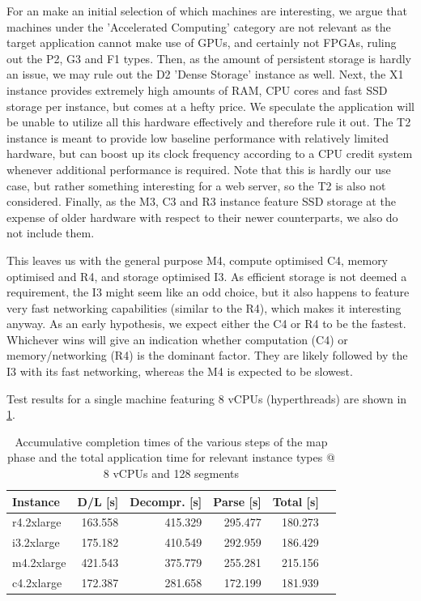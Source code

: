 \documentclass{article}
\begin{document}
For an make an initial selection of which machines are interesting, we argue that machines under the 'Accelerated Computing' category are not relevant as the target application cannot make use of GPUs, and certainly not FPGAs, ruling out the P2, G3 and F1 types. Then, as the amount of persistent storage is hardly an issue, we may rule out the D2 'Dense Storage' instance as well. Next, the X1 instance provides extremely high amounts of RAM, CPU cores and fast SSD storage per instance, but comes at a hefty price. We speculate the application will be unable to utilize all this hardware effectively and therefore rule it out. The T2 instance is meant to provide low baseline performance with relatively limited hardware, but can boost up its clock frequency according to a CPU credit system whenever additional performance is required. Note that this is hardly our use case, but rather something interesting for a web server, so the T2 is also not considered. Finally, as the M3, C3 and R3 instance feature SSD storage at the expense of older hardware with respect to their newer counterparts, we also do not include them.

This leaves us with the general purpose M4, compute optimised C4, memory optimised and R4, and storage optimised I3.
As efficient storage is not deemed a requirement, the I3 might seem like an odd choice, but it also happens to feature very fast networking capabilities (similar to the R4), which makes it interesting anyway.
As an early hypothesis, we expect either the C4 or R4 to be the fastest.
Whichever wins will give an indication whether computation (C4) or memory/networking (R4) is the dominant factor.
They are likely followed by the I3 with its fast networking, whereas the M4 is expected to be slowest.

Test results for a single machine featuring 8 vCPUs (hyperthreads) are shown in \cref{tab:single-instance}.

\begin{table}[H]
	\centering
	\caption{Accumulative completion times of the various steps of the map phase and the total application time for relevant instance types @ 8 vCPUs and 128 segments}
	\label{tab:single-instance}

	\begin{tabular}{lrrrrr}
	\toprule
	Instance	& D/L [s]	& Decompr. [s]	& Parse [s] & Total [s]	\\
	\midrule
	r4.2xlarge	& 163.558	& 415.329		& 295.477	& 180.273 	\\
	i3.2xlarge	& 175.182	& 410.549		& 292.959	& 186.429	\\
	m4.2xlarge	& 421.543	& 375.779		& 255.281	& 215.156	\\
	c4.2xlarge	& 172.387	& 281.658		& 172.199	& 181.939	\\
	\bottomrule
	\end{tabular}
\end{table}
\end{document}
